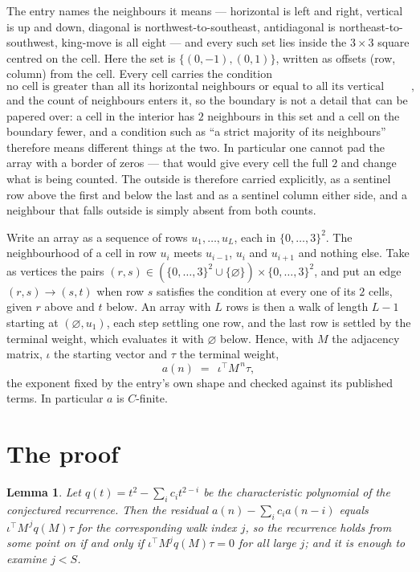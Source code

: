 \documentclass[11pt,a4paper]{article}
\theoremstyle{plain}
\newtheorem{lemma}[theorem]{Lemma}
\theoremstyle{definition}
\begin{document}
The entry names the neighbours it means --- horizontal is left and right, vertical is up and
down, diagonal is northwest-to-southeast, antidiagonal is northeast-to-southwest, king-move is
all eight --- and every such set lies inside the $3\times3$ square centred on the cell. Here
the set is $\{(0,-1), (0,1)\}$, written as offsets (row, column) from the cell. Every cell carries
the condition
\[
\text{no cell is greater than all its horizontal neighbours or equal to all its vertical neighbours},
\]
and the count of neighbours enters it, so the boundary is not a detail that can be papered
over: a cell in the interior has $2$ neighbours in this set and a cell on the boundary
fewer, and a condition such as ``a strict majority of its neighbours'' therefore means
different things at the two. In particular one cannot pad the array with a border of zeros ---
that would give every cell the full $2$ and change what is being counted. The outside is
therefore carried
explicitly, as a sentinel row above the first and below the last and as a sentinel column
either side, and a neighbour that falls outside is simply absent from both counts.

Write an array as a sequence of rows $u_1,\dots,u_L$, each in
$\{0,\dots,3\}^{2}$. The neighbourhood of a cell in row $u_i$ meets $u_{i-1}$,
$u_i$ and $u_{i+1}$ and nothing else. Take as vertices the pairs
$(r,s)\in(\{0,\dots,3\}^{2}\cup\{\varnothing\})\times\{0,\dots,3\}^{2}$,
and put an edge $(r,s)\to(s,t)$ when row $s$ satisfies the condition at every one of its
$2$ cells, given $r$ above and $t$ below. An array with $L$ rows is then a walk of length
$L-1$ starting at $(\varnothing,u_1)$, each step settling one row, and the last row is
settled by the terminal weight, which evaluates it with $\varnothing$ below. Hence,
with $M$ the adjacency matrix, $\iota$ the starting vector and $\tau$ the terminal weight,
\[
a(n)\;=\;\,\iota^{\!\top}M^{\,n}\tau ,
\]
the exponent fixed by the entry's own shape and checked against its published terms. In
particular $a$ is $C$-finite.

\section{The proof}

\begin{lemma}\label{lem:crit}
Let $q(t)=t^{2}-\sum_i c_it^{2-i}$ be the characteristic polynomial of the
conjectured recurrence. Then the residual $a(n)-\sum_ic_ia(n-i)$ equals
$\iota^{\!\top}M^{\,j}q(M)\tau$ for the corresponding walk index $j$, so the
recurrence holds from some point on if and only if $\iota^{\!\top}M^{j}q(M)\tau=0$ for all
large $j$; and it is enough to examine $j<S$.
\end{lemma}
\end{document}
